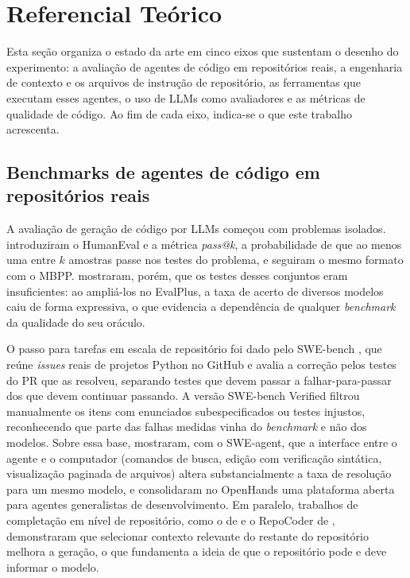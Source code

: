     
\section{Referencial Teórico} 
\label{sec:referencial-teorico}

Esta seção organiza o estado da arte em cinco eixos que sustentam o desenho do
experimento: a avaliação de agentes de código em repositórios reais, a
engenharia de contexto e os arquivos de instrução de repositório, as
ferramentas que executam esses agentes, o uso de LLMs como avaliadores e as
métricas de qualidade de código. Ao fim de cada eixo, indica-se o que este
trabalho acrescenta.

\subsection{Benchmarks de agentes de código em repositórios reais}
\label{sec:ref-benchmarks}

A avaliação de geração de código por LLMs começou com problemas isolados.
 introduziram o HumanEval e a métrica
\textit{pass@k}, a probabilidade de que ao menos uma entre $k$ amostras passe
nos testes do problema, e  seguiram o mesmo formato
com o MBPP.  mostraram, porém, que os testes
desses conjuntos eram insuficientes: ao ampliá-los no EvalPlus, a taxa de acerto
de diversos modelos caiu de forma expressiva, o que evidencia a dependência de
qualquer \textit{benchmark} da qualidade do seu oráculo.

O passo para tarefas em escala de repositório foi dado pelo SWE-bench
\cite{jimenez2024swebench}, que reúne \textit{issues} reais de projetos Python
no GitHub e avalia a correção pelos testes do PR que as resolveu, separando
testes que devem passar a falhar-para-passar dos que devem continuar passando.
A versão SWE-bench Verified \cite{openai2024swebenchverified} filtrou
manualmente os itens com enunciados subespecificados ou testes injustos,
reconhecendo que parte das falhas medidas vinha do \textit{benchmark} e não dos
modelos. Sobre essa base,  mostraram, com o
SWE-agent, que a interface entre o agente e o computador (comandos de busca,
edição com verificação sintática, visualização paginada de arquivos) altera
substancialmente a taxa de resolução para um mesmo modelo, e
 consolidaram no OpenHands uma plataforma aberta
para agentes generalistas de desenvolvimento. Em paralelo, trabalhos de
completação em nível de repositório, como o de 
e o RepoCoder de , demonstraram que selecionar
contexto relevante do restante do repositório melhora a geração, o que
fundamenta a ideia de que o repositório pode e deve informar o modelo.

